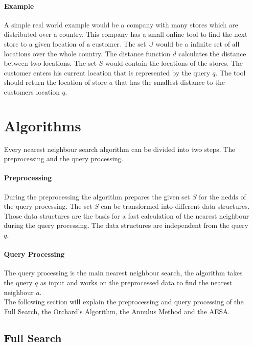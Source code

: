 \documentclass[runningheads,a4paper]{llncs}
\begin{document}
\paragraph{Example} A simple real world example would be a company with many stores which are distributed over a
country. This company has a small online tool to find the next store to a given location of a customer. The set
$\mathbb{U}$ would be a infinite set of all locations over the whole country. The distance function $d$ calculates the
distance between two locations. The set $S$ would contain the locations of the stores. The customer enters his current
location that is represented by the query $q$. The tool should return the location of store $a$ that has the smallest
distance to the customers location $q$.


\section{Algorithms}

Every nearest neighbour search algorithm can be divided into two steps. The preprocessing and the query processing.

\paragraph{Preprocessing}
During the preprocessing the algorithm prepares the given set $S$ for the nedds of the query processing. The set $S$ can
be transformed into different data structures. Those data structures are the basis for a fast calculation of the nearest
neighbour during the query processing. The data structures are independent from the query $q$.

\paragraph{Query Processing}
The query processing is the main nearest neighbour search, the algorithm takes the query $q$ as input and works on the
preprocessed data to find the nearest neighbour $a$.\\

The following section will explain the preprocessing and query processing of the Full Search, the Orchard’s Algorithm,
the Annulus Method and the AESA.

\subsection{Full Search}
\end{document}
